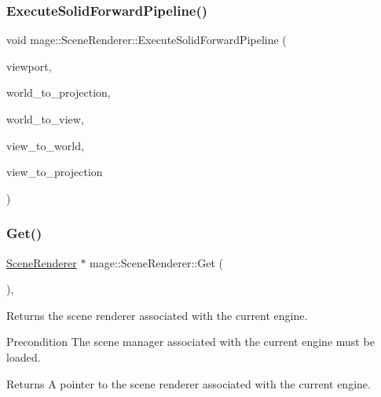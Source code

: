 \hypertarget{classmage_1_1_scene_renderer_a8571e22282629b8e53395b4d6aa25b95}{}\label{classmage_1_1_scene_renderer_a8571e22282629b8e53395b4d6aa25b95} 
\subsubsection{\texorpdfstring{Execute\+Solid\+Forward\+Pipeline()}{ExecuteSolidForwardPipeline()}}
{\footnotesize\ttfamily void mage\+::\+Scene\+Renderer\+::\+Execute\+Solid\+Forward\+Pipeline (\begin{DoxyParamCaption}\item[{const \hyperlink{structmage_1_1_viewport}{Viewport} \&}]{viewport,  }\item[{F\+X\+M\+M\+A\+T\+R\+IX}]{world\+\_\+to\+\_\+projection,  }\item[{C\+X\+M\+M\+A\+T\+R\+IX}]{world\+\_\+to\+\_\+view,  }\item[{C\+X\+M\+M\+A\+T\+R\+IX}]{view\+\_\+to\+\_\+world,  }\item[{C\+X\+M\+M\+A\+T\+R\+IX}]{view\+\_\+to\+\_\+projection }\end{DoxyParamCaption})\hspace{0.3cm}{\ttfamily [private]}}

\hypertarget{classmage_1_1_scene_renderer_a3b0e9204ffaef1cf4022c3e129eb37b7}{}\label{classmage_1_1_scene_renderer_a3b0e9204ffaef1cf4022c3e129eb37b7} 
\subsubsection{\texorpdfstring{Get()}{Get()}}
{\footnotesize\ttfamily \hyperlink{classmage_1_1_scene_renderer}{Scene\+Renderer} $\ast$ mage\+::\+Scene\+Renderer\+::\+Get (\begin{DoxyParamCaption}{ }\end{DoxyParamCaption})\hspace{0.3cm}{\ttfamily [static]}, {\ttfamily [noexcept]}}

Returns the scene renderer associated with the current engine.

\begin{DoxyPrecond}{Precondition}
The scene manager associated with the current engine must be loaded. 
\end{DoxyPrecond}
\begin{DoxyReturn}{Returns}
A pointer to the scene renderer associated with the current engine. 
\end{DoxyReturn}
\hypertarget{classmage_1_1_scene_renderer_a97f5c38b070497bd3737fc6ace775ef1}{}\label{classmage_1_1_scene_renderer_a97f5c38b070497bd3737fc6ace775ef1} 
